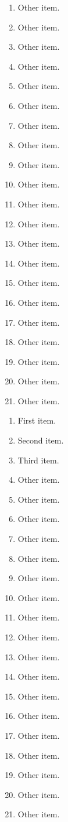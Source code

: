 \documentclass[10pt]{ltxguide}
\begin{document}
\begin{multicols}{4}
\begin{enumerate}[topsep=0em,itemsep=0em,label={\thaimultialph*.}]
        \item  Other item.
        \item  Other item.
        \item  Other item.
        \item  Other item.
        \item  Other item.
        \item  Other item.
        \item  Other item.
        \item  Other item.
        \item  Other item.
        \item  Other item.
        \item  Other item.
        \item  Other item.
        \item  Other item.
        \item  Other item.
        \item  Other item.
        \item  Other item.
        \item  Other item.
        \item  Other item.
        \item  Other item.
        \item  Other item.
        \item  Other item.
    \end{enumerate}
    \begin{enumerate}[topsep=0em,itemsep=0em,label={({\thainum*})}]
        \item  First item.
        \item  Second item.
        \item  Third item.
        \item  Other item.
        \item  Other item.
        \item  Other item.
        \item  Other item.
        \item  Other item.
        \item  Other item.
        \item  Other item.
        \item  Other item.
        \item  Other item.
        \item  Other item.
        \item  Other item.
        \item  Other item.
        \item  Other item.
        \item  Other item.
        \item  Other item.
        \item  Other item.
        \item  Other item.
        \item  Other item.
    \end{enumerate}
\end{multicols}
\end{document}
